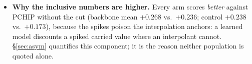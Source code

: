 \documentclass[10pt]{article}
\newcommand{\Vrot}{\ensuremath{V_\mathrm{rot}}}
\begin{document}
\begin{itemize}
        mean-squared-error, tail-carried one (\S\ref{sec:bulk}); in the median the
        \Vrot{} error ratio to persistence is 0.94--1.00, with the interval
        including 1 on 3/4 splits, at the 10\,ms photon floor
        (\S\ref{sec:physfilter}), and the two statements are made together.
  \item \textbf{Why the inclusive numbers are higher.} Every arm scores
        \emph{better} against PCHIP without the cut (backbone mean $+0.268$ vs.\
        $+0.236$; control $+0.238$ vs.\ $+0.173$), because the spikes poison the
        interpolation anchors: a learned model discounts a spiked carried value
        where an interpolant cannot. \S\ref{sec:asym} quantifies this
        component; it is the reason neither population is quoted alone.
\end{itemize}
\end{document}
